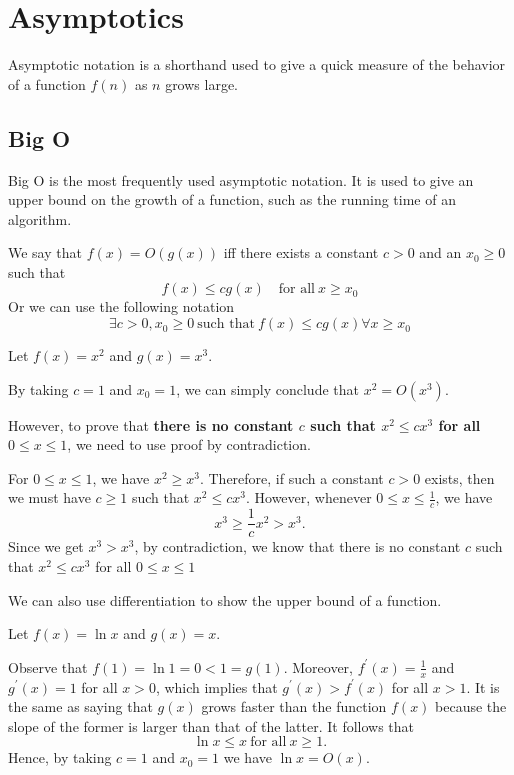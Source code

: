\chapter{Asymptotics}

Asymptotic notation is a shorthand used to give a quick measure of the behavior of a function \(f(n)\) as \(n\) grows large. 

\section{Big O}
Big O is the most frequently used asymptotic notation. It is used to give an upper bound on the growth of a function, such as the running time of an algorithm.

\begin{definition}
    We say that \(f(x) = O(g(x))\) iff there exists a constant \(c > 0\) and an \(x_0 \geq 0\) such that
    \[
    f(x) \leq cg(x)\quad\text{for all}\ x \geq x_0
    \]
    Or we can use the following notation
    \[
        \exists c > 0, x_0 \geq 0\ \text{such that}\ f(x) \leq cg(x) \forall x \geq x_0
    \]
\end{definition}

\begin{eg}
    Let \(f(x) = x^2\) and \(g(x) = x^3\). 

    By taking \(c = 1\) and \(x_0 = 1\), we can simply conclude that \(x^2 = O(x^3)\). 
    
    However, to prove that \textbf{there is no constant \(c\) such that \(x^2 \leq cx^3\) for all \(0 \leq x \leq 1\)}, we need to use proof by contradiction. 
    
    For \(0 \leq x \leq 1\), we have \(x^2 \geq x^3\). Therefore, if such a constant \(c > 0\) exists, then we must have \(c \geq 1\) such that \(x^2 \leq cx^3\). However, whenever \(0 \leq x \leq \frac{1}{c}\), we have
    \[
        x^3 \geq \dfrac{1}{c}x^2 > x^3.
    \]
    Since we get \(x^3 > x^3\), by contradiction, we know that there is no constant \(c\) such that \(x^2 \leq cx^3\) for all \(0 \leq x \leq 1\)
\end{eg}

We can also use differentiation to show the upper bound of a function.
\begin{eg}
Let \(f(x) = \ln x\) and \(g(x) = x\). 

Observe that \(f(1) = \ln 1 = 0 < 1 = g(1)\).  Moreover, \(f^{\prime} (x) = \frac{1}{x}\) and \(g^{\prime} (x) = 1\) for all \(x > 0\), which implies that \(g^{\prime}(x) > f^{\prime}(x)\) for all \(x > 1\). It is the same as saying that \(g(x)\) grows faster than the function \(f(x)\) because the slope of the former is larger than that of the latter. It follows that
\[
    \ln x \leq x\ \text{for all}\ x \geq 1.
\] 
Hence, by taking \(c = 1\) and \(x_0 = 1\) we have \(\ln x = O(x).\) 
\end{eg}

